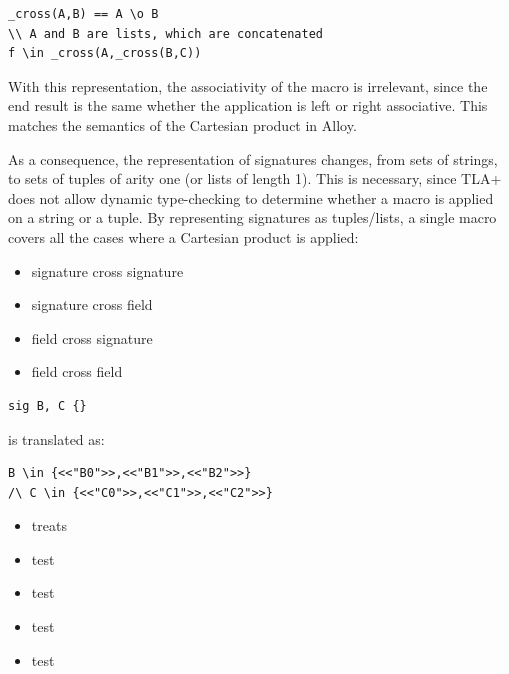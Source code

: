 \begin{lstlisting}
_cross(A,B) == A \o B
\\ A and B are lists, which are concatenated
f \in _cross(A,_cross(B,C))
\end{lstlisting}

With this representation, the associativity of the macro is irrelevant, since the end result is the same whether the application is left or right associative. This matches the semantics of the Cartesian product in Alloy.

As a consequence, the representation of signatures changes, from sets of strings, to sets of tuples of arity one (or lists of length 1). This is necessary, since TLA+ does not allow dynamic type-checking to determine whether a macro is applied on a string or a tuple. By representing signatures as tuples/lists, a single macro covers all the cases where a Cartesian product is applied:

\begin{itemize}
	\item signature cross signature
	\item signature cross field
	\item field cross signature
	\item field cross field
\end{itemize}

\begin{lstlisting}
sig B, C {}
\end{lstlisting}

is translated as:

\begin{lstlisting}
B \in {<<"B0">>,<<"B1">>,<<"B2">>}
/\ C \in {<<"C0">>,<<"C1">>,<<"C2">>}
\end{lstlisting}

\begin{itemize}
	\item treats
	\item test
	\item test
	\item test
	\item test
\end{itemize}


